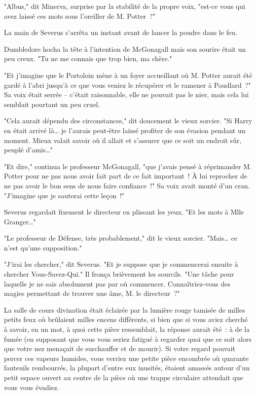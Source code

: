 "Albus," dit Minerva, surprise par la stabilité de la propre voix, "est-ce vous qui avez laissé ces mots sous l'oreiller de M. Potter~?"

La main de Severus s'arrêta un instant avant de lancer la poudre dans le feu.

Dumbledore hocha la tête à l'intention de McGonagall mais son sourire était un peu creux. "Tu ne me connais que trop bien, ma chère."

"Et j'imagine que le Portoloin mène à un foyer accueillant où M. Potter aurait été gardé à l'abri jusqu'à ce que vous veniez le récupérer et le ramener à Poudlard~?" Sa voix était serrée -- c'était raisonnable, elle ne pouvait pas le nier, mais cela lui semblait pourtant un peu cruel.

"Cela aurait dépendu des circonstances," dit doucement le vieux sorcier. "Si Harry en était arrivé là… je l'aurais peut-être laissé profiter de son évasion pendant un moment. Mieux valait savoir où il allait et s'assurer que ce soit un endroit sûr, peuplé d'amis…"

"Et dire," continua le professeur McGonagall, "que j'avais pensé à réprimander M. Potter pour ne pas nous avoir fait part de ce fait important~! À lui reprocher de ne pas avoir le bon sens de nous faire confiance~!" Sa voix avait monté d'un cran. "J'imagine que je sauterai cette leçon~!"

Severus regardait fixement le directeur en plissant les yeux. "Et les mots à Mlle Granger…"

"Le professeur de Défense, très probablement," dit le vieux sorcier. "Mais… ce n'est qu'une supposition."

"J'irai les chercher," dit Severus. "Et je suppose que je commencerai ensuite à chercher Vous-Savez-Qui." Il fronça brièvement les sourcils. "Une tâche pour laquelle je ne sais absolument pas par où commencer. Connaîtriez-vous des magies permettant de trouver une âme, M. le directeur~?"

\later

La salle de cours divination était éclairée par la lumière rouge tamisée de milles petits feux où brûlaient milles encens différents, si bien que si vous aviez cherché à savoir, en un mot, à quoi cette pièce ressemblait, la réponse aurait été~: à de la fumée (en supposant que vous vous seriez fatigué à regarder quoi que ce soit alors que votre nez menaçait de surchauffer et de mourir). Si votre regard pouvait percer ces vapeurs humides, vous verriez une petite pièce encombrée où quarante fauteuils rembourrés, la plupart d'entre eux inusités, étaient amassés autour d'un petit espace ouvert au centre de la pièce où une trappe circulaire attendait que vous vous évadiez.

